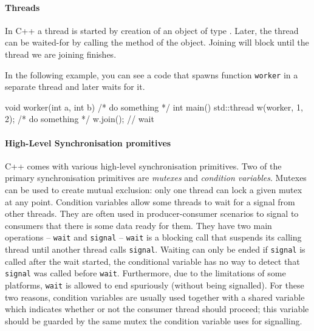 \paragraph{Threads}
%
In C++ a thread is started by creation of an object of type
.
Later, the thread can be waited-for by calling the  method of the
 object.
Joining will block until the thread we are joining finishes.\begin{marginnote}%
  In the following example, you can see a code that spawns function \texttt{worker} in a separate thread and later waits for it.

  \medskip
  \begin{cppcode}
    void worker(int a,
                int b) {
      /* do something */
    }
    int main() {
      std::thread
          w(worker, 1, 2);
      /* do something */
      w.join(); // wait
    }
  \end{cppcode}
\end{marginnote}

\paragraph{High-Level Synchronisation promitives}

C++ comes with various high-level synchronisation primitives.
Two of the primary synchronisation primitives are \emph{mutexes} and \emph{condition variables}.
Mutexes can be used to create mutual exclusion: only one thread can lock a
given mutex at any point.
Condition variables allow some threads to wait for a signal from other threads.
They are often used in producer-consumer scenarios to signal to consumers that
there is some data ready for them.
They have two main operations -- \texttt{wait} and \texttt{signal} --
\texttt{wait} is a blocking call that suspends its calling thread until another
thread calls \texttt{signal}.
Waiting can only be ended if \texttt{signal} is called after the wait started,
the conditional variable has no way to detect that \texttt{signal} was called
before \texttt{wait}.
Furthermore, due to the limitations of some platforms, \texttt{wait} is allowed
to end spuriously (without being signalled).
For these two reasons, condition variables are usually used together with a
shared variable which indicates whether or not the consumer thread should
proceed; this variable should be guarded by the same mutex the condition
variable uses for signalling.

